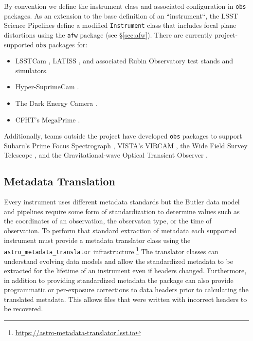By convention we define the instrument class and associated configuration in \texttt{obs} packages.
As an extension to the base definition of an ``instrument``, the LSST Science Pipelines define a modified \texttt{Instrument} class that includes focal plane distortions using the \texttt{afw} package (see \S\ref{sec:afw}).
There are currently project-supported \texttt{obs} packages for:

\begin{itemize}
\item LSSTCam \citep{2010SPIE.7735E..0JK}, LATISS \citep{2020SPIE11452E..0UI}, and associated Rubin Observatory test stands and simulators.
\item Hyper-SuprimeCam \citep{2018PASJ...70S...1M}.
\item The Dark Energy Camera \citep{2008SPIE.7014E..0ED}.
\item CFHT's MegaPrime \citep{2003SPIE.4841...72B}.
\end{itemize}

Additionally, teams outside the project have developed \texttt{obs} packages to support Subaru's Prime Focus Spectrograph \citep{2020SPIE11447E..7VW}, VISTA's VIRCAM \citep{2015A&A...575A..25S},
the Wide Field Survey Telescope \citep[WFST;][]{2025arXiv250115018C}, and the Gravitational-wave Optical Transient Observer \citep[GOTO;][]{2021PASA...38....4M}.

\subsection{Metadata Translation}

Every instrument uses different metadata standards but the Butler data model and pipelines require some form of standardization to determine values such as the coordinates of an observation, the observaton type, or the time of observation.
To perform that standard extraction of metadata each supported instrument must provide a metadata translator class using the \texttt{astro\_metadata\_translator} infrastructure.\footnote{\url{https://astro-metadata-translator.lsst.io}}
The translator classes can understand evolving data models and allow the standardized metadata to be extracted for the lifetime of an instrument even if headers changed.
Furthermore, in addition to providing standardized metadata the package can also provide programmatic or per-exposure corrections to data headers prior to calculating the translated metadata.
This allows files that were written with incorrect headers to be recovered.
